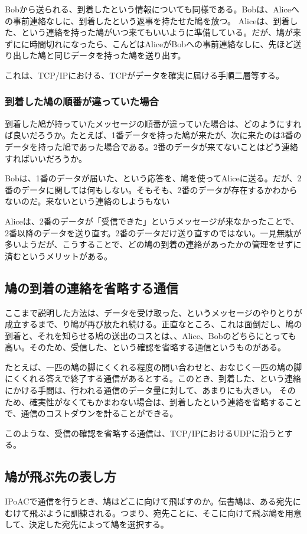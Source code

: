 Bobから送られる、到着したという情報についても同様である。Bobは、Aliceへの事前連絡なしに、到着したという返事を持たせた鳩を放つ。
Aliceは、到着した、という連絡を持った鳩がいつ来てもいいように準備している。だが、鳩が来ずにに時間切れになったら、こんどはAliceがBobへの事前連絡なしに、先ほど送り出した鳩と同じデータを持った鳩を送り出す。

これは、TCP/IPにおける、TCPがデータを確実に届ける手順二層等する。

\subsubsection{到着した鳩の順番が違っていた場合}
到着した鳩が持っていたメッセージの順番が違っていた場合は、どのようにすれば良いだろうか。たとえば、1番データを持った鳩が来たが、次に来たのは3番のデータを持った鳩であった場合である。2番のデータが来てないことはどう連絡すればいいだろうか。

Bobは、1番のデータが届いた、という応答を、鳩を使ってAliceに送る。だが、2番のデータに関しては何もしない。そもそも、2番のデータが存在するかわからないのだ。来ないという連絡のしようもない

Aliceは、2番のデータが「受信できた」というメッセージが来なかったことで、2番以降のデータを送り直す。2番のデータだけ送り直すのではない。一見無駄が多いようだが、こうすることで、どの鳩の到着の連絡があったかの管理をせずに済むというメリットがある。


\subsection{鳩の到着の連絡を省略する通信}
ここまで説明した方法は、データを受け取った、というメッセージのやりとりが成立するまで、り鳩が再び放たれ続ける。正直なところ、これは面倒だし、鳩の到着と、それを知らせる鳩の送出のコスとは、、Alice、Bobのどちらにとっても高い。そのため、受信した、という確認を省略する通信というものがある。

たとえば、一匹の鳩の脚にくくれる程度の問い合わせと、おなじく一匹の鳩の脚にくくれる答えで終了する通信があるとする。このとき、到着した、という連絡にかける手間は、行われる通信のデータ量に対して、あまりにも大きい。
そのため、確実性がなくてもかまわない場合は、到着したという連絡を省略することで、通信のコストダウンを計ることができる。

このような、受信の確認を省略する通信は、TCP/IPにおけるUDPに沿うとする。

\subsection{鳩が飛ぶ先の表し方}
IPoACで通信を行うとき、鳩はどこに向けて飛ばすのか。伝書鳩は、ある宛先にむけて飛ぶように訓練される。つまり、宛先ことに、そこに向けて飛ぶ鳩を用意して、決定した宛先によって鳩を選択する。

